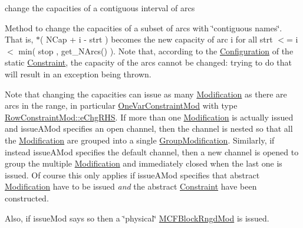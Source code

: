 change the capacities of a contiguous interval of arcs 

Method to change the capacities of a subset of arcs with \char`\"{}contiguous
names\char`\"{}. That is, $\ast$( N\+Cap + i -\/ strt ) becomes the new capacity of arc i for all strt $<$= i $<$ min( stop , get\+\_\+\+N\+Arcs() ). Note that, according to the \mbox{\hyperlink{class_s_m_spp__di__unipi__it_1_1_configuration}{Configuration}} of the static \mbox{\hyperlink{class_s_m_spp__di__unipi__it_1_1_constraint}{Constraint}}, the capacity of the arcs cannot be changed\+: trying to do that will result in an exception being thrown.

Note that changing the capacities can issue as many \mbox{\hyperlink{class_s_m_spp__di__unipi__it_1_1_modification}{Modification}} as there are arcs in the range, in particular \mbox{\hyperlink{class_s_m_spp__di__unipi__it_1_1_one_var_constraint_mod}{One\+Var\+Constraint\+Mod}} with type \mbox{\hyperlink{class_s_m_spp__di__unipi__it_1_1_row_constraint_mod_af91e41a206e988d55a31347acd6f5d33a6c90a5d6f098c2913eef0d4058b65b1f}{Row\+Constraint\+Mod\+::e\+Chg\+R\+HS}}. If more than one \mbox{\hyperlink{class_s_m_spp__di__unipi__it_1_1_modification}{Modification}} is actually issued and issue\+A\+Mod specifies an open channel, then the channel is nested so that all the \mbox{\hyperlink{class_s_m_spp__di__unipi__it_1_1_modification}{Modification}} are grouped into a single \mbox{\hyperlink{class_s_m_spp__di__unipi__it_1_1_group_modification}{Group\+Modification}}. Similarly, if instead issue\+A\+Mod specifies the default channel, then a new channel is opened to group the multiple \mbox{\hyperlink{class_s_m_spp__di__unipi__it_1_1_modification}{Modification}} and immediately closed when the last one is issued. Of course this only applies if issue\+A\+Mod specifies that abstract \mbox{\hyperlink{class_s_m_spp__di__unipi__it_1_1_modification}{Modification}} have to be issued {\itshape and} the abstract \mbox{\hyperlink{class_s_m_spp__di__unipi__it_1_1_constraint}{Constraint}} have been constructed.

Also, if issue\+Mod says so then a \char`\"{}physical\char`\"{} \mbox{\hyperlink{class_s_m_spp__di__unipi__it_1_1_m_c_f_block_rngd_mod}{M\+C\+F\+Block\+Rngd\+Mod}} is issued. \mbox{\label{class_s_m_spp__di__unipi__it_1_1_m_c_f_block_a521e6ec429dd1558b34f6be23db855a9}} 
